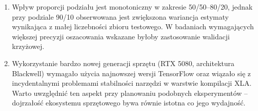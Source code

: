 \documentclass[12pt]{article}
\begin{document}
\begin{enumerate}
  \item Wpływ proporcji podziału jest monotoniczny w zakresie 50/50--80/20, jednak przy podziale 90/10 obserwowana jest zwiększona wariancja estymaty wynikająca z małej liczebności zbioru testowego. W badaniach wymagających większej precyzji oszacowania wskazane byłoby zastosowanie walidacji krzyżowej.

  \item Wykorzystanie bardzo nowej generacji sprzętu (RTX 5080, architektura Blackwell) wymagało użycia najnowszej wersji TensorFlow oraz wiązało się z incydentalnymi problemami stabilności narzędzi w warstwie kompilacji XLA. Warto uwzględnić ten aspekt przy planowaniu podobnych eksperymentów -- dojrzałość ekosystemu sprzętowego bywa równie istotna co jego wydajność.
\end{enumerate}

\renewcommand\refname{Bibliografia}


\end{document}
